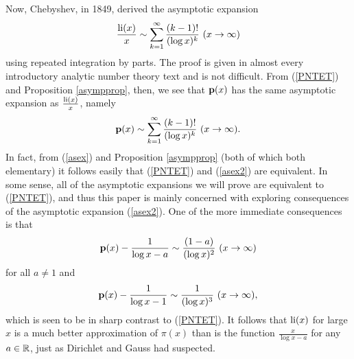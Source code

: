 \documentclass[12pt]{article}
\begin{document}
Now, Chebyshev, in 1849,  derived  the asymptotic expansion
\begin{align}\label{asex}
\frac{\operatorname{li}(x)}{x} \sim \sum_{k = 1}^\infty {\frac {(k-1)!}{(\log x)^{k}}} \ (x \to \infty)
\end{align}
using repeated integration by parts.  The proof  is given in almost every introductory analytic number theory text and is not difficult.  From (\ref{PNTET}) and   Proposition \ref{asympprop}, then, we see that ${\mathbf p}(x)$ has the same asymptotic expansion as $\frac{\operatorname{li}(x)}{x}$, namely
\begin{align}\label{asex2}
{\mathbf p}(x) \sim \sum_{k = 1}^\infty {\frac {(k-1)!}{(\log x)^{k}}} \ (x \to \infty).
\end{align}
 In fact, from (\ref{asex}) and Proposition \ref{asympprop} (both of which both elementary) it follows easily that (\ref{PNTET})  and (\ref{asex2}) are equivalent.  In some sense, all of the asymptotic expansions we will prove are equivalent to (\ref{PNTET}), and thus this paper is mainly concerned with exploring consequences of the asymptotic expansion  (\ref{asex2}).     One of the more immediate consequences is that
$${\mathbf p}(x) -\frac{1}{\log x-a} \sim \frac{(1-a)}{(\log x)^{2}}   \ (x \to \infty)$$ 
for all $a \neq 1$ and
$${\mathbf p}(x) -\frac{1}{\log x-1} \sim \frac{1}{(\log x)^{3}}   \ (x \to \infty),$$
which is seen to be in sharp contrast to (\ref{PNTET}).  It follows that $\operatorname{li}(x)$ for large $x$ is a much better approximation of $\pi(x)$ than is the function  $ \frac{x}{\log x-a} $ for any $a \in {\mathbb R}$, just as Dirichlet and Gauss had suspected.

\end{document}

